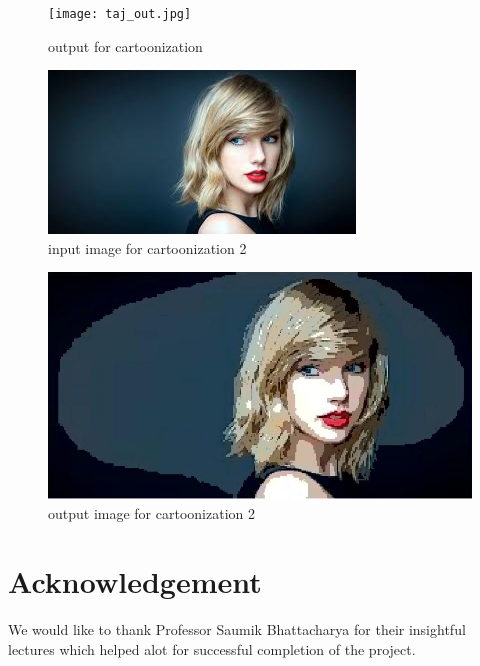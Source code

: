 \documentclass[conference]{IEEEtran}
\begin{document}
  \begin{figure}
 	\texttt{[image: taj\_out.jpg]}
 	\caption{output for cartoonization}
 	\label{fig:outputCartoon}
 \end{figure}
 
  \begin{figure}
 	\includegraphics[width = \linewidth]{taylor.jpg}
 	\caption{input image for cartoonization 2}
 	\label{fig:inputCartoon2}
 \end{figure}
 
   \begin{figure}
 	\includegraphics[width = \linewidth]{taylor_out.jpg}
 	\caption{output image for cartoonization 2}
 	\label{fig:outputCartoon2}
 \end{figure}
 

\section{Acknowledgement}
We would like to thank Professor Saumik Bhattacharya for their insightful lectures which helped alot for successful completion of the project. 
\end{document}

